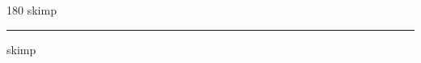 
\begin{frame}
\begin{center}
\begin{turn}{180}
{\fontsize{2.5cm}{1em}\selectfont skimp}
\end{turn}
\vspace{1em}\par  
\hrule
\vspace{1em}\par  
{\fontsize{2.5cm}{1em}\selectfont skimp}
\end{center}
\end{frame}
